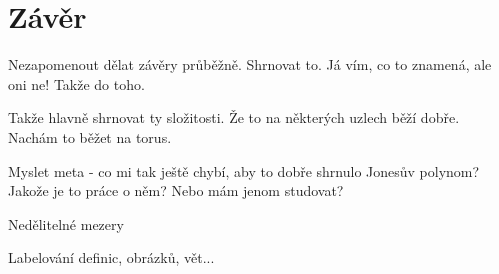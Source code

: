 \chapter*{Závěr}

Nezapomenout dělat závěry průběžně. Shrnovat to. Já vím, co to znamená, ale oni ne! Takže do toho.

Takže hlavně shrnovat ty složitosti. Že to na některých uzlech běží dobře. Nachám to běžet na torus.

Myslet meta - co mi tak ještě chybí, aby to dobře shrnulo Jonesův polynom?
Jakože je to práce o něm? Nebo mám jenom studovat?

Nedělitelné mezery

Labelování definic, obrázků, vět...